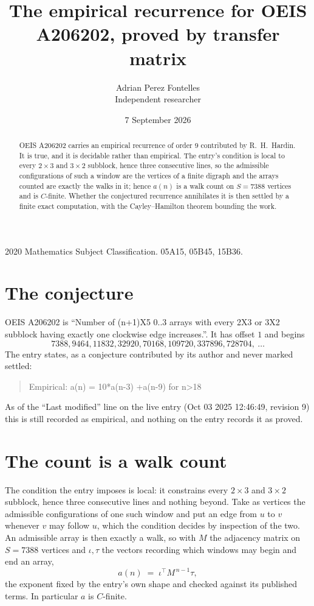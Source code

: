 \documentclass[11pt,a4paper]{article}
\title{The empirical recurrence for OEIS A206202, proved by transfer matrix}
\author{Adrian Perez Fontelles\\ \small Independent researcher}
\date{7 September 2026}
\theoremstyle{plain}
\theoremstyle{definition}
\begin{document}
\maketitle

\begin{abstract}
OEIS A206202 carries an empirical recurrence of order $9$ contributed by R.~H.~Hardin. It is
true, and it is decidable rather than empirical. The entry's condition is local to every $2\times3$ and $3\times2$ subblock, hence three consecutive lines, so
the admissible configurations of such a window are the vertices of a finite digraph and the
arrays counted are exactly the walks in it; hence $a(n)$ is a walk count on $S=7388$ vertices
and is $C$-finite. Whether the conjectured recurrence annihilates it is then settled by a
finite exact computation, with the Cayley--Hamilton theorem bounding the work.
\end{abstract}

\noindent\small 2020 Mathematics Subject Classification. 05A15, 05B45, 15B36.\normalsize

\section{The conjecture}

OEIS A206202 is ``Number of (n+1)X5 0..3 arrays with every 2X3 or 3X2 subblock having exactly one clockwise edge increases.''. It has offset $1$ and begins
\[
7388, 9464, 11832, 32920, 70168, 109720, 337896, 728704,\ \dots
\]
The entry states, as a conjecture contributed by its author and never marked settled:
\begin{quote}
Empirical: a(n) = 10*a(n-3) +a(n-9) for n>18
\end{quote}
As of the ``Last modified'' line on the live entry (Oct 03 2025 12:46:49, revision 9) this is still
recorded as empirical, and nothing on the entry records it as proved.

\section{The count is a walk count}

The condition the entry imposes is local: it constrains every $2\times3$ and $3\times2$ subblock, hence three consecutive lines and nothing beyond. Take as
vertices the admissible configurations of one such window and put an edge from $u$ to $v$
whenever $v$ may follow $u$, which the condition decides by inspection of the two. An
admissible array is then exactly a walk, so with $M$ the adjacency matrix on $S=7388$ vertices
and $\iota,\tau$ the vectors recording which windows may begin and end an array,
\[
a(n)\;=\;\iota^{\!\top}M^{\,n-1}\tau ,
\]
the exponent fixed by the entry's own shape and checked against its published terms. In
particular $a$ is $C$-finite.
\end{document}
